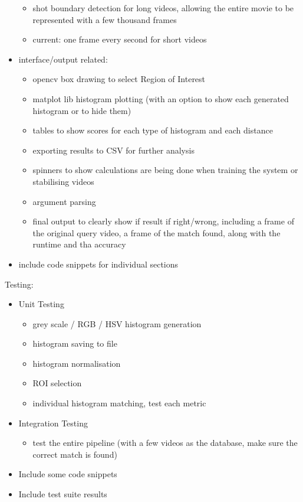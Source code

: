 \begin{itemize}
\begin{itemize}
            \item shot boundary detection for long videos, allowing the entire movie to be represented with a few thousand frames
            \item current: one frame every second for short videos
        \end{itemize}
    \item interface/output related: 
    \begin{itemize}
        \item opencv box drawing to select Region of Interest
        \item matplot lib histogram plotting (with an option to show each generated histogram or to hide them)
        \item tables to show scores for each type of histogram and each distance
        \item exporting results to CSV for further analysis
        \item spinners to show calculations are being done when training the system or stabilising videos 
        \item argument parsing
        \item final output to clearly show if result if right/wrong, including a frame of the original query video, a frame of the match found, along with the runtime and tha accuracy
    \end{itemize}
    \item include code snippets for individual sections
\end{itemize}

Testing:
\begin{itemize}
    \item Unit Testing
        \begin{itemize}
            \item grey scale / RGB / HSV histogram generation
            \item histogram saving to file
            \item histogram normalisation
            \item ROI selection
            \item individual histogram matching, test each metric
        \end{itemize}
    \item Integration Testing
        \begin{itemize}
            \item test the entire pipeline (with a few videos as the database, make sure the correct match is found)
        \end{itemize}
    \item Include some code snippets
    \item Include test suite results
\end{itemize}

